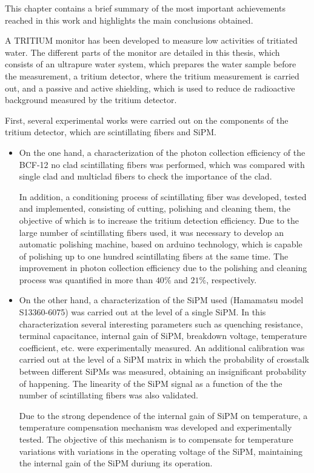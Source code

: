 This chapter contains a brief summary of the most important achievements reached in this work and highlights the main conclusions obtained.

A TRITIUM monitor has been developed to measure low activities of tritiated water. The different parts of the monitor are detailed in this thesis, which consists of an ultrapure water system, which prepares the water sample before the measurement, a tritium detector, where the tritium measurement is carried out, and a passive and active shielding, which is used to reduce de radioactive background measured by the tritium detector.

First, several experimental works were carried out on the components of the tritium detector, which are scintillating fibers and SiPM.

\begin{itemize}

\item{} On the one hand, a characterization of the photon collection efficiency of the BCF-12 no clad scintillating fibers was performed, which was compared with single clad and multiclad fibers to check the importance of the clad. 

In addition, a conditioning process of scintillating fiber was developed, tested and implemented, consisting of cutting, polishing and cleaning them, the objective of which is to increase the tritium detection efficiency. Due to the large number of scintillating fibers used, it was necessary to develop an automatic polishing machine, based on arduino technology, which is capable of polishing up to one hundred scintillating fibers at the same time. The improvement in photon collection efficiency due to the polishing and cleaning process was quantified in more than $40\%$ and $21\%$, respectively. 

\item{} On the other hand, a characterization of the SiPM used (Hamamatsu model S13360-6075) was carried out at the level of a single SiPM. In this characterization several interesting parameters such as quenching resistance, terminal capacitance, internal gain of SiPM, breakdown voltage, temperature coefficient, etc. were experimentally measured. An additional calibration was carried out at the level of a SiPM matrix in which the probability of crosstalk between different SiPMs was measured, obtaining an insignificant probability of happening. The linearity of the SiPM signal as a function of the the number of scintillating fibers was also validated.

Due to the strong dependence of the internal gain of SiPM on temperature, a temperature compensation mechanism was developed and experimentally tested. The objective of this mechanism is to compensate for temperature variations with variations in the operating voltage of the SiPM, maintaining the internal gain of the SiPM duriung its operation.

\end{itemize}

